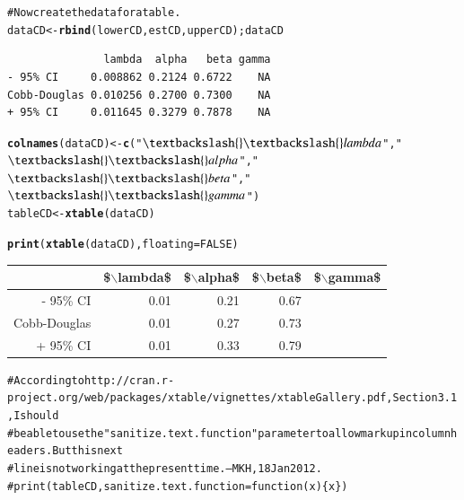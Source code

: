 \documentclass[preprint,authoryear,12pt]{elsarticle}\usepackage{graphicx, color}
\makeatletter
\newcommand{\hlfunctioncall}[1]{\textcolor[rgb]{0.501960784313725,0,0.329411764705882}{\textbf{#1}}}%
\newcommand{\hlstring}[1]{\textcolor[rgb]{0.6,0.6,1}{#1}}%
\newcommand{\hlcomment}[1]{\textcolor[rgb]{0.180392156862745,0.6,0.341176470588235}{#1}}%
\newenvironment{kframe}{%
 \def\at@end@of@kframe{}%
 \ifinner\ifhmode%
  \def\at@end@of@kframe{\end{minipage}}%
  \begin{minipage}{\columnwidth}%
 \fi\fi%
 \def\FrameCommand##1{\hskip\@totalleftmargin \hskip-\fboxsep
 \colorbox{shadecolor}{##1}\hskip-\fboxsep
     \hskip-\linewidth \hskip-\@totalleftmargin \hskip\columnwidth}%
 \MakeFramed {\advance\hsize-\width
   \@totalleftmargin\z@ \linewidth\hsize
   \@setminipage}}%
 {\par\unskip\endMakeFramed%
 \at@end@of@kframe}
\newenvironment{knitrout}{}{} %
\makeatother
\begin{document}
\begin{knitrout}
\begin{kframe}
\begin{alltt}
\hlcomment{# Now create the data for a table.}
dataCD <- \hlfunctioncall{rbind}(lowerCD, estCD, upperCD); dataCD
\end{alltt}
\begin{verbatim}
               lambda  alpha   beta gamma
- 95% CI     0.008862 0.2124 0.6722    NA
Cobb-Douglas 0.010256 0.2700 0.7300    NA
+ 95% CI     0.011645 0.3279 0.7878    NA
\end{verbatim}
\begin{alltt}
\hlfunctioncall{colnames}(dataCD)  <- \hlfunctioncall{c}(\hlstring{"$\textbackslash{}\textbackslash{}lambda$"}, \hlstring{"$\textbackslash{}\textbackslash{}alpha$"}, \hlstring{"$\textbackslash{}\textbackslash{}beta$"}, \hlstring{"$\textbackslash{}\textbackslash{}gamma$"})
tableCD  <- \hlfunctioncall{xtable}(dataCD)
\end{alltt}


{\ttfamily\noindent\color{warningcolor}{Warning: provided 3 variables to replace 1 variables}}\end{kframe}
\end{knitrout}


\begin{kframe}
\begin{alltt}
\hlfunctioncall{print}(\hlfunctioncall{xtable}(dataCD), floating=FALSE)
\end{alltt}
\end{kframe}%
\begin{tabular}{rrrrl}
  \hline
 & \$$\backslash$lambda\$ & \$$\backslash$alpha\$ & \$$\backslash$beta\$ & \$$\backslash$gamma\$ \\ 
  \hline
- 95\% CI & 0.01 & 0.21 & 0.67 &  \\ 
  Cobb-Douglas & 0.01 & 0.27 & 0.73 &  \\ 
  + 95\% CI & 0.01 & 0.33 & 0.79 &  \\ 
   \hline
\end{tabular}
\begin{kframe}\begin{alltt}
\hlcomment{# According to http://cran.r-project.org/web/packages/xtable/vignettes/xtableGallery.pdf, Section 3.1, I should }
\hlcomment{# be able to use the "sanitize.text.function" parameter to allow markup in column headers. But this next}
\hlcomment{# line is not working at the present time. --MKH, 18 Jan 2012.}
\hlcomment{# print(tableCD, sanitize.text.function = function(x)\{x\})}
\end{alltt}
\end{kframe}
\end{document}
